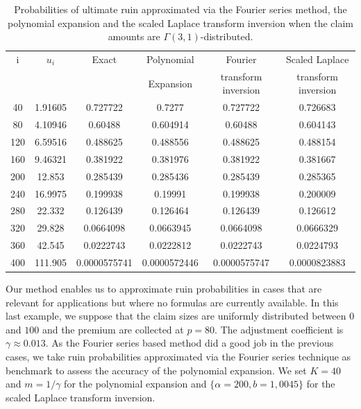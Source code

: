 \begin{table}
\begin{center}
\begin{tabular}{|c|c||c|c|c|c|}
  \hline
i&$u_{i}$&Exact&Polynomial &Fourier& Scaled Laplace\\
   && &Expansion& transform inversion &transform inversion \\
\hline
  \hline
  40 & 1.91605 & 0.727722 & 0.7277 & 0.727722 & 0.726683 \\
 80 & 4.10946 & 0.60488 & 0.604914 & 0.60488 & 0.604143 \\
 120 & 6.59516 & 0.488625 & 0.488556 & 0.488625 & 0.488154 \\
 160 & 9.46321 & 0.381922 & 0.381976 & 0.381922 & 0.381667 \\
 200 & 12.853 & 0.285439 & 0.285436 & 0.285439 & 0.285365 \\
 240 & 16.9975 & 0.199938 & 0.19991 & 0.199938 & 0.200009 \\
 280 & 22.332 & 0.126439 & 0.126464 & 0.126439 & 0.126612 \\
 320 & 29.828 & 0.0664098 & 0.0663945 & 0.0664098 & 0.0666329 \\
 360 & 42.545 & 0.0222743 & 0.0222812 & 0.0222743 & 0.0224793 \\
 400 & 111.905 & 0.0000575741 & 0.0000572446 & 0.0000575747 & 0.0000823883 \\
  \hline
\end{tabular} 
\caption{Probabilities of ultimate ruin approximated via the Fourier series method, the polynomial expansion and the scaled Laplace transform inversion when the claim amounts are $\Gamma(3,1)$-distributed.}\label{RuinProbaTableGamma31}
\end{center}
\end{table}

Our method enables us to approximate ruin probabilities in cases that are relevant for applications but where no formulas are currently available. In this last example, we suppose that the claim sizes are uniformly distributed between $0$ and $100$ and the premium are collected at $p=80$. The adjustment coefficient is $\gamma\approx0.013$. As the Fourier series based method did a good job in the previous cases, we take ruin probabilities approximated via the Fourier series technique as benchmark to assess the accuracy of the polynomial expansion. We set $K=40$ and $m=1/\gamma$ for the polynomial  expansion and $\{\alpha=200,b=1,0045\}$ for the scaled Laplace transform inversion.\\

